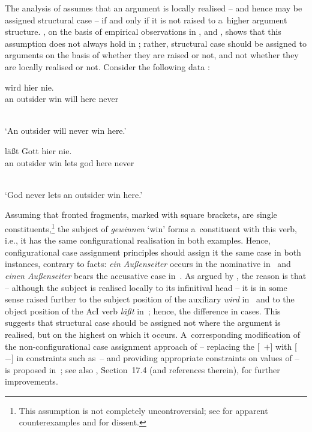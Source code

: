 \documentclass[output=paper]{langsci/langscibook}
\begin{document}
The analysis of \citealt{prze:96,Prze99b,Prze99} assumes that an argument is locally realised – and hence may be assigned structural case – if and only if it is not raised to a~higher argument structure.  \citet{Meurers99c,Meurers99b}, on the basis of empirical observations in \citealt{Haider90a}, \citealt{Grewendorf94a} and \citealt{Mueller97c-Eng-Short-Cross}, shows that this assumption does not always hold in ; rather, structural case should be assigned to arguments on the basis of whether they are raised or not, and not whether they are locally realised or not.  Consider the following data \citep[294]{Meurers99c}:
\begin{examples}
\item \label{win:ss}
  \begin{gloss}
     wird hier nie. \\
    \phtm{[}an\Nom{} outsider win\Inf{} will here never
  \end{gloss}\\[\glosslen]
  `An outsider will never win here.'
\item \label{win:so}
  \begin{gloss}
     l\"a\ss{}t Gott hier
    nie. \\
    \phtm{[}an\Acc{} outsider win\Inf{} lets god here never
  \end{gloss}\\[\glosslen]
  `God never lets an outsider win here.'
\end{examples}
Assuming that fronted fragments, marked with square brackets, are single constituents,\footnote{This assumption is not completely uncontroversial; see \citealt[100–101]{kiss:94a} for apparent counterexamples and \citealt{Mueller2003b,Mueller2005d,MuellerGS} for dissent.} the subject of \emph{gewinnen} ‘win’ forms a~constituent with this verb, i.e., it has the same configurational realisation in both examples.  Hence, configurational case assignment principles should assign it the same case in both instances, contrary to facts: \emph{ein Au\ss{}enseiter} occurs in the nominative in~ and \emph{einen Au\ss{}enseiter} bears the accusative case in~.  As argued by \citealt{Meurers99c,Meurers99b}, the reason is that – although the subject is realised locally to its infinitival head – it is in some sense raised further to the subject position of the auxiliary \emph{wird} in~ and to the object position of the AcI verb \emph{l\"a\ss{}t} in~; hence, the difference in cases.  This suggests that structural case should be assigned not where the argument is realised, but on the highest  on which it occurs.  A~corresponding modification of the non-configurational case assignment approach of \citealt{prze:96,Prze99b,Prze99} – replacing the [~$+$] with [~$-$] in constraints such as~– and providing appropriate constraints on values of  – is proposed in~\citealt[93–95]{Prze99b}; see also \citealt{MuellerLehrbuch3}, Section~17.4 (and references therein), for further improvements.
\end{document}
